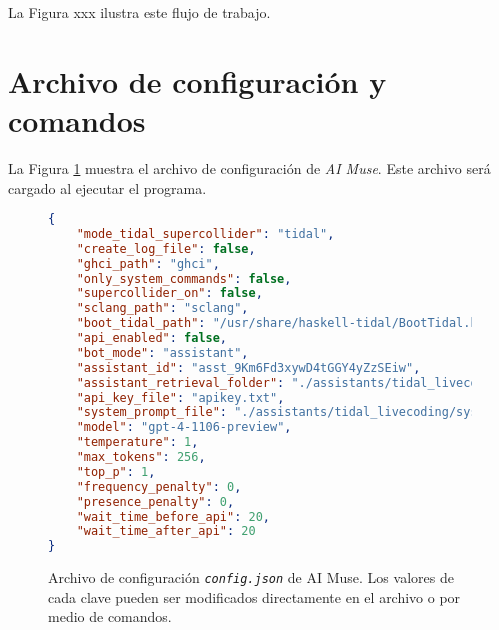 La Figura xxx ilustra este flujo de trabajo.


\section{Archivo de configuración y comandos}

La Figura \ref{fig:json} muestra el archivo de configuración de \emph{AI Muse}. Este archivo será cargado al ejecutar el programa.

\begin{figure}[H]
    \caption[Archivo de configuración \texttt{config.json} de AI Muse]{Archivo de configuración \texttt{\emph{config.json}} de AI Muse. Los valores de cada clave pueden ser modificados directamente en el archivo o por medio de comandos.}
    \centering
\begin{lstlisting}[language=json, numbers=none]
{
    "mode_tidal_supercollider": "tidal",
    "create_log_file": false,
    "ghci_path": "ghci",
    "only_system_commands": false,
    "supercollider_on": false,
    "sclang_path": "sclang",
    "boot_tidal_path": "/usr/share/haskell-tidal/BootTidal.hs",
    "api_enabled": false,
    "bot_mode": "assistant",
    "assistant_id": "asst_9Km6Fd3xywD4tGGY4yZzSEiw",
    "assistant_retrieval_folder": "./assistants/tidal_livecoding/retrieval_files/",
    "api_key_file": "apikey.txt",
    "system_prompt_file": "./assistants/tidal_livecoding/system_prompts/system_prompt_01",
    "model": "gpt-4-1106-preview",
    "temperature": 1,
    "max_tokens": 256,
    "top_p": 1,
    "frequency_penalty": 0,
    "presence_penalty": 0,
    "wait_time_before_api": 20,
    "wait_time_after_api": 20
}
\end{lstlisting}
    \source{\propio}
    \label{fig:json}
\end{figure}



